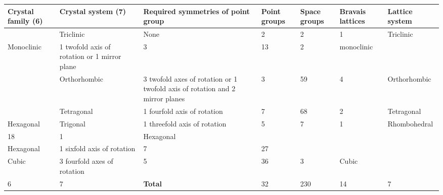 \documentclass{article}
\begin{document}
\begin{tabular}{lllllll}
    \hline
    Crystal family (6) & Crystal system (7) & Required symmetries of point
    group &  {Point groups} & {Space groups} & {Bravais lattices} &  {Lattice system}\\
    \hline
     \multicolumn{2}{c}{Triclinic} & None & 2 & 2 & 1 &{Triclinic} \\
    {Monoclinic} & 1 twofold {axis of rotation} or 1 {mirror plane} & 3 & 13 & 2 & {monoclinic} &\\
     ~&{Orthorhombic} & 3 twofold axes of rotation or 1 twofold axis of rotation and 2 mirror planes & 3 & 59 & 4 & {Orthorhombic} &\\
     ~&{Tetragonal} & 1 fourfold axis of rotation & 7 & 68 & 2 &  {Tetragonal}&\\
    {Hexagonal} & Trigonal & 1 threefold axis of rotation & 5 & 7 & 1 & Rhombohedral\\ 
    18 & 1 & Hexagonal & & & &\\
    Hexagonal & 1 sixfold axis of rotation & 7 & 27 & & &\\
    {Cubic} & 3 fourfold axes of rotation & 5 & 36 & 3 &  {Cubic} &\\
    6 & 7 & \textbf{Total} & 32 & 230 & 14 & 7\\
    \hline
    \end{tabular}
    
\end{document}
